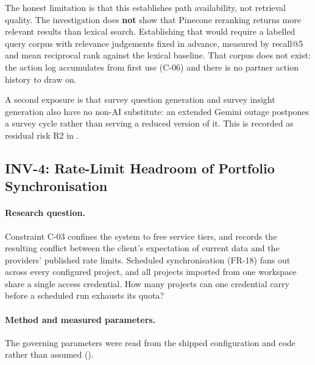 The honest limitation is that this establishes path availability, not retrieval
quality. The investigation does \textbf{not} show that Pinecone reranking
returns more relevant results than lexical search. Establishing that would
require a labelled query corpus with relevance judgements fixed in advance,
measured by recall@5 and mean reciprocal rank against the lexical baseline. That
corpus does not exist: the action log accumulates from first use (C-06) and
there is no partner action history to draw on.

A second exposure is that survey question generation and survey insight
generation also have no non-AI substitute: an extended Gemini outage postpones a
survey cycle rather than serving a reduced version of it. This is recorded as
residual risk R2 in .

\subsection{INV-4: Rate-Limit Headroom of Portfolio Synchronisation}
\label{subsec:inv4}

\paragraph{Research question.} Constraint C-03 confines the system to free
service tiers, and  records the resulting conflict between
the client's expectation of current data and the providers' published rate
limits. Scheduled synchronisation (FR-18) fans out across every configured
project, and all projects imported from one workspace share a single access
credential. How many projects can one credential carry before a scheduled run
exhausts its quota?

\paragraph{Method and measured parameters.} The governing parameters were read
from the shipped configuration and code rather than assumed
().

